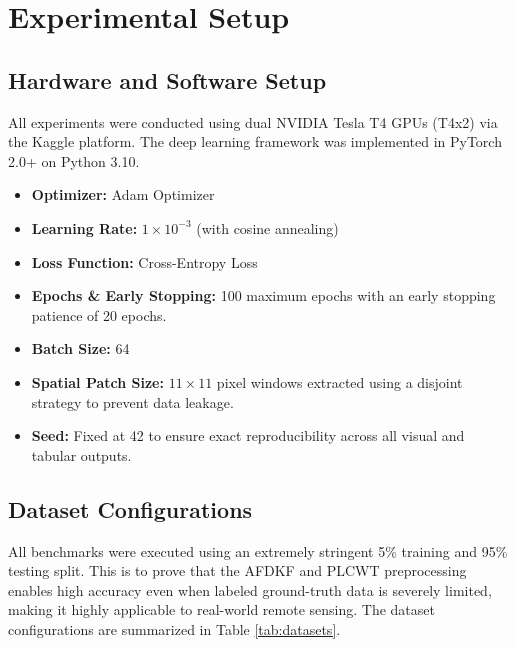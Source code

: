 \documentclass[pdflatex,sn-mathphys-num,iicol]{sn-jnl}
\begin{document}

\section{Experimental Setup}\label{sec:setup}

\subsection{Hardware and Software Setup}
All experiments were conducted using dual NVIDIA Tesla T4 GPUs (T4x2) via the Kaggle platform. The deep learning framework was implemented in PyTorch 2.0+ on Python 3.10. 
\begin{itemize}
    \item \textbf{Optimizer:} Adam Optimizer
    \item \textbf{Learning Rate:} $1 \times 10^{-3}$ (with cosine annealing)
    \item \textbf{Loss Function:} Cross-Entropy Loss
    \item \textbf{Epochs \& Early Stopping:} 100 maximum epochs with an early stopping patience of 20 epochs.
    \item \textbf{Batch Size:} 64
    \item \textbf{Spatial Patch Size:} $11 \times 11$ pixel windows extracted using a disjoint strategy to prevent data leakage.
    \item \textbf{Seed:} Fixed at 42 to ensure exact reproducibility across all visual and tabular outputs.
\end{itemize}

\subsection{Dataset Configurations}
All benchmarks were executed using an extremely stringent 5\% training and 95\% testing split. This is to prove that the AFDKF and PLCWT preprocessing enables high accuracy even when labeled ground-truth data is severely limited, making it highly applicable to real-world remote sensing. The dataset configurations are summarized in Table \ref{tab:datasets}.
\end{document}
